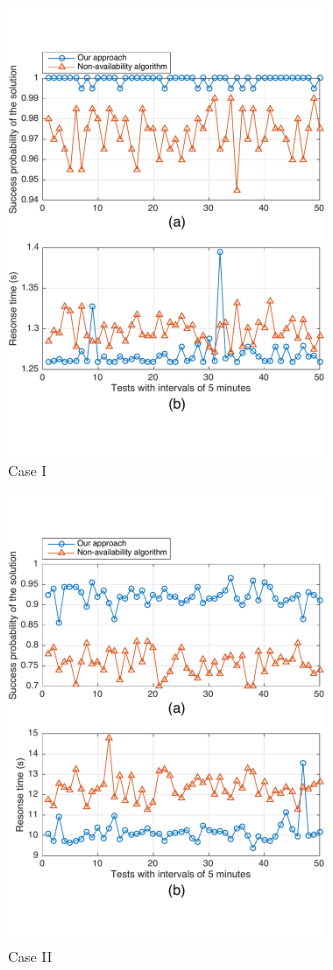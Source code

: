 \documentclass[journal]{IEEEtran}
\begin{document}
\begin{figure}[!t]
\centering
\includegraphics[width=3.3in]{./img/Task-6.pdf}
\caption{Case I}
\label{Task-6}
\end{figure}


\begin{figure}[!t]
\centering
\includegraphics[width=3.3in]{./img/Task-12.pdf}
\caption{Case II}
\label{Task-12}
\end{figure}
\end{document}
